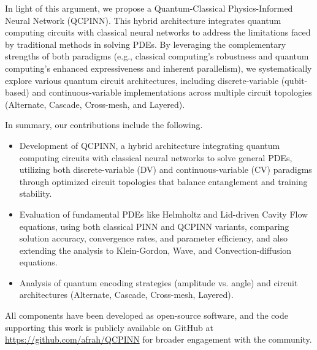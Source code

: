 In light of this argument, we propose a Quantum-Classical Physics-Informed Neural Network (QCPINN). This hybrid architecture integrates quantum computing circuits with classical neural networks to address the limitations faced by traditional methods in solving PDEs. By leveraging the complementary strengths of both paradigms (e.g., classical computing's robustness and quantum computing's enhanced expressiveness and inherent parallelism), we systematically explore various quantum circuit architectures, including discrete-variable (qubit-based) and continuous-variable implementations across multiple circuit topologies (Alternate, Cascade, Cross-mesh, and Layered).  


In summary, our contributions include the following.

\begin{itemize}
    \item Development of QCPINN, a hybrid architecture integrating quantum computing circuits with classical neural networks to solve general PDEs, utilizing both discrete-variable (DV) and continuous-variable (CV) paradigms through optimized circuit topologies that balance entanglement and training stability.
    
    \item Evaluation of fundamental PDEs like Helmholtz and Lid-driven Cavity Flow equations, using both classical PINN and QCPINN variants, comparing 
    solution accuracy, convergence rates, and parameter efficiency, and also extending the analysis to Klein-Gordon, Wave, and Convection-diffusion equations.
    
    \item Analysis of quantum encoding strategies (amplitude vs. angle) and circuit architectures (Alternate, Cascade, Cross-mesh, Layered).

\end{itemize}

All components have been developed as open-source software, and the code supporting this work is publicly available on GitHub at \url{https://github.com/afrah/QCPINN} for broader engagement with the community. 

